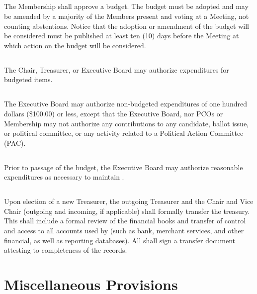 \subsection{}\label{budget-adoption}
The Membership shall approve a budget. The budget must be adopted and may be amended by a majority of the Members present and voting at a Meeting, not counting abstentions. Notice that the adoption or amendment of the budget will be considered must be published at least ten (10) days before the Meeting at which action on the budget will be considered.

\subsection{}
The Chair, Treasurer, or Executive Board may authorize expenditures for budgeted items.

\subsection{}
The Executive Board may authorize non-budgeted expenditures of one hundred dollars (\$100.00) or less, except that the Executive Board, nor PCOs or Membership may not authorize any contributions to any candidate, ballot issue, or political committee, or any activity related to a Political Action Committee (PAC).

\subsection{}
Prior to passage of the budget, the Executive Board may authorize reasonable expenditures as necessary to maintain \thedistrict{}.

\subsection{}
Upon election of a new Treasurer, the outgoing Treasurer and the Chair and Vice Chair (outgoing and incoming, if applicable) shall formally transfer the treasury. This shall include a formal review of the financial books and transfer of control and access to all accounts used by \thedistrict{} (such as bank, merchant services, and other financial, as well as reporting databases). All shall sign a transfer document attesting to completeness of the records.

\section{Miscellaneous Provisions}
